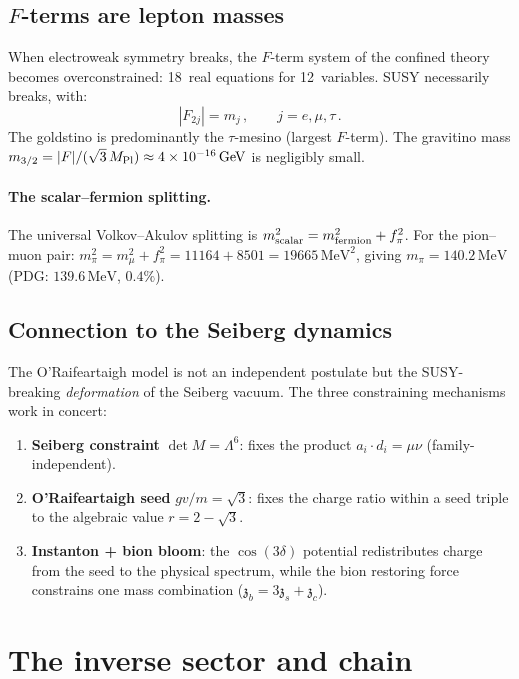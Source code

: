 \documentclass[12pt,a4paper]{article}
\newcommand{\MeV}{\,\mathrm{MeV}}
\newcommand{\GeV}{\,\mathrm{GeV}}
\newcommand{\zch}{\mathfrak{z}}
\begin{document}
\subsection{$F$-terms are lepton masses}

When electroweak symmetry breaks, the $F$-term system of the
confined theory becomes overconstrained: 18~real equations for
12~variables.
SUSY necessarily breaks, with:
\begin{equation}
  |F_{2j}| = m_j\,,\qquad j = e, \mu, \tau\,.
  \label{eq:Fterms_leptons}
\end{equation}
The goldstino is predominantly the $\tau$-mesino (largest
$F$-term).
The gravitino mass
$m_{3/2} = |F|/(\sqrt{3}\,M_{\rm Pl})
\approx 4 \times 10^{-16}\GeV$
is negligibly small.

\paragraph{The scalar--fermion splitting.}
The universal Volkov--Akulov splitting is
$m^2_{\rm scalar} = m^2_{\rm fermion} + f_\pi^2$.
For the pion--muon pair:
$m_\pi^2 = m_\mu^2 + f_\pi^2 = 11164 + 8501 = 19665\MeV^2$,
giving $m_\pi = 140.2\MeV$ (PDG: $139.6\MeV$, $0.4\%$).


\subsection{Connection to the Seiberg dynamics}

The O'Raifeartaigh model is not an independent postulate but the
SUSY-breaking \emph{deformation} of the Seiberg vacuum.
The three constraining mechanisms work in concert:
\begin{enumerate}
  \item \textbf{Seiberg constraint} $\det M = \Lambda^6$:
    fixes the product $a_i \cdot d_i = \mu\nu$
    (family-independent).
  \item \textbf{O'Raifeartaigh seed} $gv/m = \sqrt{3}$:
    fixes the charge ratio within a seed triple
    to the algebraic value $r = 2 - \sqrt{3}$.
  \item \textbf{Instanton + bion bloom}: the $\cos(3\delta)$
    potential redistributes charge from the seed to the physical
    spectrum, while the bion restoring force constrains one mass
    combination ($\zch_b = 3\zch_s + \zch_c$).
\end{enumerate}


\section{The inverse sector and chain}
\label{sec:inverse}
\end{document}
